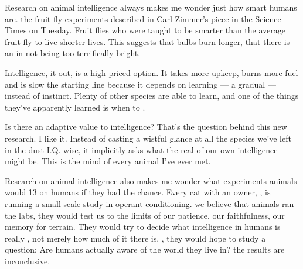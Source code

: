 \qquad Research on animal intelligence always makes me wonder just how smart humans are. \underline{\quad}   the fruit-fly experiments described in Carl Zimmer’s piece in the Science Times on Tuesday. Fruit flies who were taught to be smarter than the average fruit fly \underline{\quad}   to live shorter lives. This suggests that \underline{\quad}   bulbs burn longer, that there is an \underline{\quad}     in not being too terrifically bright.

\qquad Intelligence, it \underline{\quad}    out, is a high-priced option. It takes more upkeep, burns more fuel and is slow \underline{\quad}    the starting line because it depends on learning — a gradual \underline{\quad}    — instead of instinct. Plenty of other species are able to learn, and one of the things they’ve apparently learned is when to \underline{\quad}.

\qquad Is there an adaptive value to \underline{\quad}    intelligence? That's the question behind this new research. I like it. Instead of casting a wistful glance \underline{\quad}    at all the species we've left in the dust I.Q.-wise, it implicitly asks what the real \underline{\quad}    of our own intelligence might be. This is \underline{\quad}   the mind of every animal I’ve ever met.

\qquad Research on animal intelligence also makes me wonder what experiments animals would 13   on humans if they had the chance. Every cat with an owner, \underline{\quad}   , is running a small-scale study in operant conditioning. we believe that \underline{\quad}  animals ran the labs, they would test us to \underline{\quad}   the limits of our patience, our faithfulness, our memory for terrain. They would try to decide what intelligence in humans is really \underline{\quad}, not merely how much of it there is.   \underline{\quad}, they would hope to study a \underline{\quad}   question: Are humans actually aware of the world they live in? \underline{\quad}   the results are inconclusive.

